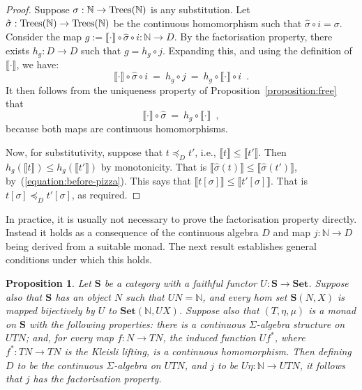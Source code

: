 \documentclass[a4paper,UKenglish]{lipics-v2018}
\newcommand{\Nat}{\mathbb{N}}
\newcommand{\Tree}{\textnormal{Trees}} %
\newcommand{\Basicleq}{\preccurlyeq}
\newcommand{\Sem}[1]{\llbracket #1 \rrbracket}
\newcommand{\Set}{\mathbf{Set}}
\theoremstyle{plain}
\newtheorem{proposition}[theorem]{Proposition}
\begin{document}
\begin{proof}
Suppose $\sigma: \Nat \to \Tree(\Nat)$ is any  substitution.
Let $\hat{\sigma} : \Tree(\Nat) \to \Tree(\Nat)$ be the continuous homomorphism
such that $\hat{\sigma} \circ i = \sigma$. Consider the map $g := \llbracket \cdot \rrbracket \circ \hat{\sigma} \circ i : \Nat \to D$. By the factorisation property, there exists $h_g : D \to D$ such that
$g = h_g \circ j$. Expanding this, and using the definition of $\Sem{\cdot}$, we have:
\[
 \llbracket \cdot \rrbracket \circ \hat{\sigma} \circ i ~ = ~ h_g \circ j ~ = ~  h_g \circ  \llbracket \cdot \rrbracket \circ i \enspace .
\]
It then follows from  the uniqueness property of Proposition~\ref{proposition:free} that
\begin{equation}
\label{equation:before-pizza}
\llbracket \cdot \rrbracket \circ \hat{\sigma} ~ = ~ h_g \circ  \llbracket \cdot \rrbracket \enspace ,
\end{equation}
because both maps are continuous homomorphisms.

Now, for substitutivity, suppose  that $t \Basicleq_D t'$, i.e., $\Sem{t} \leq \Sem{t'}$. Then 
$h_g (\Sem{t})  \leq h_g(\Sem{t'})$ by monotonicity. That is
$\Sem{ \hat{\sigma}(t)} \leq \Sem{ \hat{\sigma}(t')}$, by~(\ref{equation:before-pizza}). 
This says that $\Sem{ t[\sigma]} \leq \Sem{t'[\sigma]}$. That is
$t[\sigma] \Basicleq_D t'[\sigma]$, as required.
\end{proof}

In practice, it is usually not necessary to prove the factorisation property directly. Instead  it holds as a consequence of the continuous algebra $D$ and map $j: \Nat \to D$ being derived from a suitable monad. The next result establishes general conditions under which this holds.
\begin{proposition}
\label{proposition:monad}
Let $\mathbf{S}$ be a category with a faithful functor $U : \mathbf{S} \to \Set$. Suppose also that 
$\mathbf{S}$ has an object $N$ such that $UN = \mathbb{N}$, and every hom set $\mathbf{S}(N,X)$
is mapped bijectively by $U$ to $\Set(\Nat,UX)$. Suppose also that $(T,\eta,\mu)$ is a monad on $\mathbf{S}$
with the following properties: there is a continuous $\Sigma$-algebra structure on $UTN$; and, for 
every map $f \colon N \to TN$, the induced function $Uf^*$, where 
$f^* \colon TN \to TN$ is the Kleisli lifting, is a continuous  homomorphism.
Then defining $D$ to be the continuous $\Sigma$-algebra on $U T N$, and
$j$ to be $U\eta \colon \mathbb{N} \to UTN$, it follows that $j$ has the factorisation property.
\end{proposition}
\end{document}
